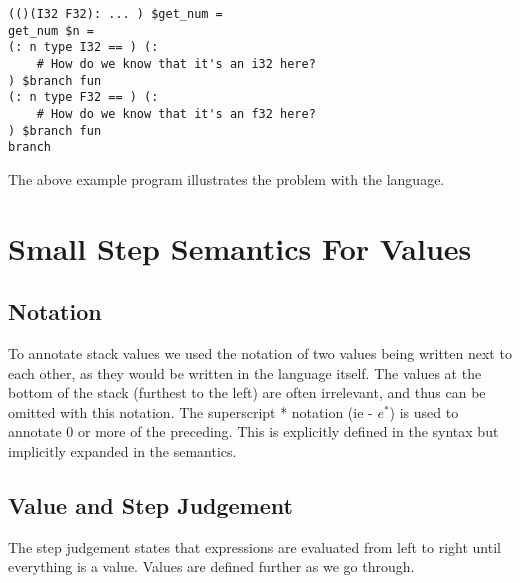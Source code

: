 \documentclass{article}
\begin{document}
\begin{verbatim}
(()(I32 F32): ... ) $get_num =
get_num $n =
(: n type I32 == ) (: 
    # How do we know that it's an i32 here?
) $branch fun
(: n type F32 == ) (: 
    # How do we know that it's an f32 here?
) $branch fun
branch
\end{verbatim}

The above example program illustrates the problem with the language.

\section{Small Step Semantics For Values}
\subsection{Notation}
To annotate stack values we used the notation of two values being written next to each other, as they would be written in the language itself. The values at the bottom of the stack (furthest to the left) are often irrelevant, and thus can be omitted with this notation. The superscript * notation (ie - $e^*$) is used to annotate 0 or more of the preceding. This is explicitly defined in the syntax but implicitly expanded in the semantics.

\subsection{Value and Step Judgement}
The step judgement states that expressions are evaluated from left to right until everything is a value. Values are defined further as we go through.
{
    \centering
    \def \MathparLineskip {\lineskip=0.43cm}
}
\end{document}
